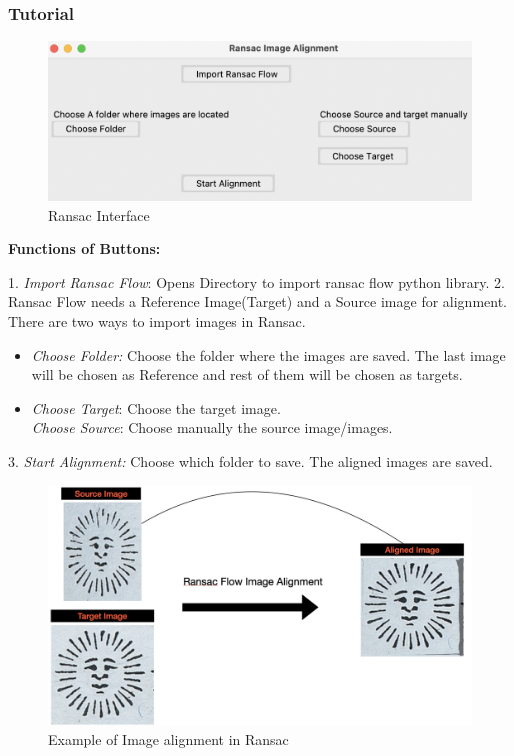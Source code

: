 \documentclass[12pt]{article}
\begin{document}
\subsubsection{Tutorial}
\begin{figure}[h]
    \centering
    \includegraphics[scale=0.48]{Ransac Interface.png}
    \caption{Ransac Interface}
    \label{fig:mesh3}
\end{figure}
\begin{flushleft}
\textbf{Functions of Buttons:}\\
\end{flushleft}
1. \textit{Import Ransac Flow}: Opens Directory to import ransac flow python library.
2. Ransac Flow needs a Reference Image(Target) and a Source image for alignment.\\ There are two ways to import images in Ransac.
\begin{itemize}
    \item \textit{Choose Folder:} Choose the folder where the images are saved. The last image will be chosen as Reference and rest of them will be chosen as targets.
    \item \textit{Choose Target}: Choose the target image.\\
    \textit{Choose Source}: Choose manually the source image/images.
\end{itemize}
3. \textit{Start Alignment:} Choose which folder to save. The aligned images are saved.
\begin{figure}[h]
    \centering
    \includegraphics[scale=0.48]{Ransac Example.png}
    \caption{Example of Image alignment in Ransac}
    \label{fig:mesh4}
\end{figure}
\end{document}
